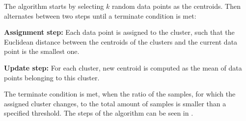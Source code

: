 The algorithm starts by selecting $k$ random data points as the centroids. Then alternates between two steps until a terminate condition is met:
\begin{description}
    \item{\textbf{Assignment step:}} Each data point is assigned to the cluster, such that the Euclidean distance between the centroids of the clusters and the current data point is the smallest one.
    \item{\textbf{Update step:}} For each cluster, new centroid is computed as the mean of data points belonging to this cluster.
\end{description}

The terminate condition is met, when the ratio of the samples, for which the assigned cluster changes, to the total amount of samples is smaller than a specified threshold. The steps of the algorithm can be seen in .
